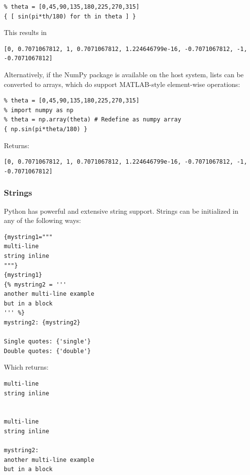 {\begin{verbatim}
% theta = [0,45,90,135,180,225,270,315] 
{ [ sin(pi*th/180) for th in theta ] }
\end{verbatim}

This results in

\begin{small}
\begin{verbatim}
[0, 0.7071067812, 1, 0.7071067812, 1.224646799e-16, -0.7071067812, -1, -0.7071067812]
\end{verbatim}
\end{small}

Alternatively, if the NumPy package is available on the host system, lists can be 
converted to arrays, which do support MATLAB-style element-wise operations:

\begin{verbatim}
% theta = [0,45,90,135,180,225,270,315]
% import numpy as np
% theta = np.array(theta) # Redefine as numpy array
{ np.sin(pi*theta/180) }
\end{verbatim}

Returns:

\begin{small}
\begin{verbatim}
[0, 0.7071067812, 1, 0.7071067812, 1.224646799e-16, -0.7071067812, -1, -0.7071067812]
\end{verbatim}
\end{small}

\subsubsection{Strings}\label{interfaces:strings}

Python has powerful and extensive string support. Strings can be initialized 
in any of the following ways:

\begin{verbatim}
{mystring1="""
multi-line
string inline
"""}
{mystring1}
{% mystring2 = '''
another multi-line example
but in a block
''' %}
mystring2: {mystring2}

Single quotes: {'single'}
Double quotes: {'double'}
\end{verbatim}

Which returns:

\begin{verbatim}
multi-line
string inline


multi-line
string inline

mystring2:
another multi-line example
but in a block



\end{verbatim}}
